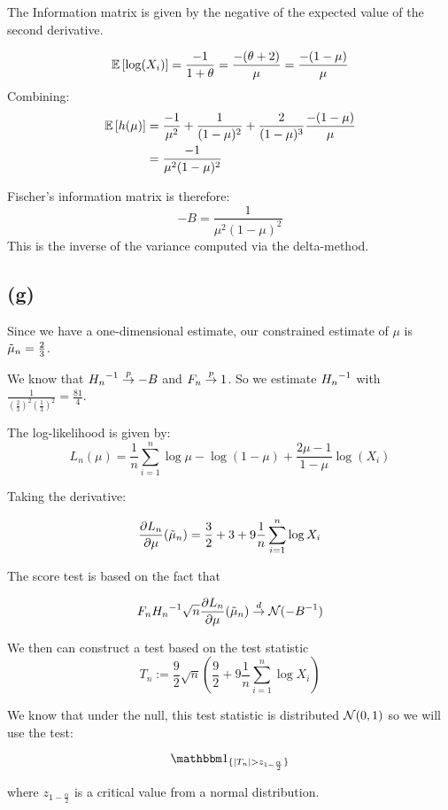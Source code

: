 \documentclass[12pt]{paper}
\begin{document}
The Information matrix is given by the negative of the expected value of the second
derivative.

\begin{equation*}
  \mathbb{E} \left [  \log( X_i)  \right ] = \frac{-1}{1+\theta} = \frac{-(\theta+2)}{\mu} = \frac{-(1-\mu)}{\mu}
\end{equation*}
Combining:
\begin{align*}
  \mathbb{E} \left [  h(\mu) \right ] &= \frac{-1}{\mu^2} + \frac{1}{(1-\mu)^2} + \frac{2}{(1-\mu)^3}
                \frac{-(1-\mu)}{\mu}\\
                &= \frac{-1}{\mu^2 (1-\mu)^2}
\end{align*}

Fischer's information matrix is therefore:
\begin{equation*}
  -B = \frac{1}{\mu^2 ( 1 - \mu)^2}
\end{equation*}
This is the inverse of the variance computed via the delta-method.


\subsection{(g)}

Since we have a one-dimensional estimate, our constrained estimate of
$\mu$ is $\tilde{ \mu }_{n} = \frac{2}{3}$.

We know that ${H_n}^{-1} \overset{p}{\to} -B$ and $F_n \overset{p}{\to} 1$. So we estimate
${H_n}^{-1}$ with $\frac{1}{(\frac{2}{3})^2 (\frac{1}{3})^2} = \frac{81}{4}$.

The log-likelihood is given by: 
\begin{equation*}
  L_n( \mu )= \frac{1}{n} \sum_{i=1}^n \log \mu - \log ( 1 - \mu) 
  + \frac{2\mu - 1}{ 1 - \mu} \log( X_i )
 \end{equation*}

 Taking the derivative:

 \begin{equation*}
   \frac{ \partial L_n}{ \partial \mu}( \tilde{ \mu }_{n}) = \frac{3}{2} + 3 +  9 \frac{1}{n} \sum_{i=1}^n \log X_i
 \end{equation*}

 The score test is based on the fact that

 \begin{equation*}
   F_n {H_n}^{-1} \sqrt{n} \frac{ \partial L_n}{ \partial \mu}(\tilde{ \mu }_{n}) \overset{d}{\to}
   \mathcal{N}( {-B}^{-1})
 \end{equation*}

 We then can construct a test based on the test statistic
 \begin{equation*}
   T_n := \frac{9}{2} \sqrt{n} \left(  \frac{9}{2} + 9 \frac{1}{n}
     \sum_{i=1}^n \log X_i \right)
 \end{equation*}

 We know that under the null, this test statistic is distributed
 $\mathcal{N}(0,1)$ so we will use the test:

 \begin{equation*}
   \indicate{\abs{T_n} > z_{1-\frac{\alpha}{2}}}
 \end{equation*}

 where $z_{1-\frac{\alpha}{2}}$ is a critical value from a normal distribution.
\end{document}
